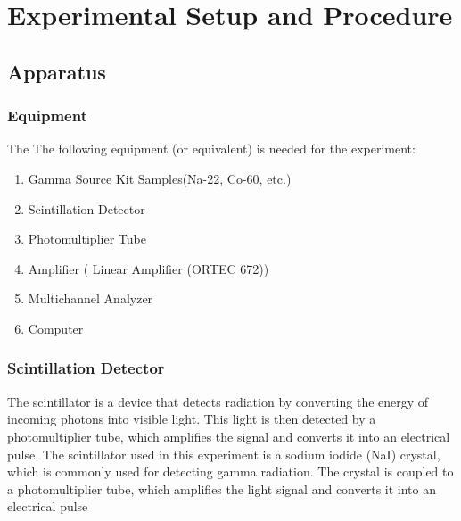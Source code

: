 \documentclass[12pt]{article}
\begin{document}
\section{Experimental Setup and Procedure}
        \subsection{Apparatus}
                \subsubsection{Equipment}
                The The following equipment (or equivalent) is needed for the experiment:

                        \begin{enumerate}
                                \item Gamma Source Kit Samples(Na-22, Co-60, etc.)
                                \item Scintillation Detector
                                \item Photomultiplier Tube
                                \item Amplifier ( Linear Amplifier (ORTEC 672))
                                \item Multichannel Analyzer
                                \item Computer
                        \end{enumerate}
                        
                \subsubsection{Scintillation Detector}
                        The scintillator is a device that detects radiation by converting the energy of incoming
                        photons into visible light. This light is then detected by a photomultiplier tube, which
                        amplifies the signal and converts it into an electrical pulse. The scintillator used in
                        this experiment is a sodium iodide (NaI) crystal, which is commonly used for detecting
                        gamma radiation. The crystal is coupled to a photomultiplier tube, which amplifies the
                        light signal and converts it into an electrical pulse
                
\end{document}
